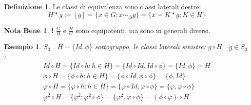 \documentclass{article}
\newtheorem{exmp}{Esempio}[section]
\theoremstyle{definition}
\newtheorem{definition}{Definizione}[section]
\newtheorem{nb}{Nota Bene}[section]
\begin{document}
\begin{definition}
        Le classi di equivalenza sono \underline{classi laterali destre}:
        \begin{equation*}
                H * g := [g] = \{x \in G : x \sim_{\Delta} g \} = \{x = K * g : K \in H\}
        \end{equation*}
\end{definition}

\begin{tcolorbox}
       \begin{nb}
               \textbf{!} $ \frac{G}{H} $ e $ \frac{H}{G} $ sono equipotenti, ma sono in generali diversi.
       \end{nb} 
\end{tcolorbox}
\begin{exmp}
        $S_3 \quad H = \{Id, \phi \} $ sottogruppo, le classi laterali sinistre: $ g \circ H \quad  g \in S_3 $:
        \begin{align*}
                Id \circ H = \{Id \circ h : h \in H\} = \{Id \circ Id, Id \circ \phi \} = \{Id, \phi\} = H \\
                \phi \circ H = \{\phi \circ h : h \in H\} = \{\phi \circ Id, \phi \circ \phi\} = \{\phi, Id\} \\
                \varphi \circ H = \{\varphi \circ h : h \in H\} = \{\varphi \circ Id, \varphi \circ \phi\} = \{\varphi, \varphi \circ \phi\} \\
                \varphi^2 \circ H = \{\varphi^2 :  \varphi^2 \circ \phi\} = \{\varphi^2, \varphi \circ \phi\} = (\phi \circ \varphi) \circ H \\
        \end{align*}
\end{exmp}
\end{document}
